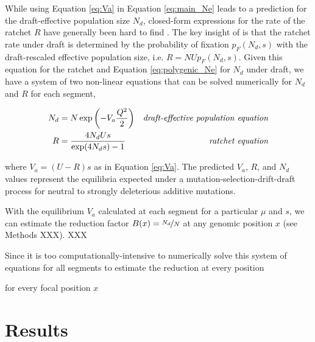 \documentclass[11pt]{article}
\begin{document}
While using Equation \eqref{eq:Va} in Equation \eqref{eq:main_Ne} leads to a
prediction for the draft-effective population size $N_d$, closed-form
expressions for the rate of the ratchet $R$ have generally been hard to find
\parencite{Haigh1978-gt,Higgs1995-xc,Gessler1995-hz}. The key insight of
\textcite{Santiago2016-mu} is that the ratchet rate under draft is determined
by the probability of fixation $p_F(N_d, s)$
\parencite{Kimura1962-su,Malecot1948-zv} with the draft-rescaled effective
population size, i.e. $R = N U p_F(N_d, s)$. Given this equation for the
ratchet and Equation \eqref{eq:polygenic_Ne} for $N_d$ under draft, we have a
system of two non-linear equations that can be solved numerically for $N_d$ and
$R$ for each segment,

\begin{align}
  \label{eq:main_eqns}
  N_d &= N \exp \left( -V_a \frac{Q^2}{2} \right) & \text{\emph{draft-effective population equation}} \\
  R &= \frac{4N_d U s}{\exp(4 N_d s)-1}  & \text{\emph{ratchet equation}}
\end{align}

where $V_a = (U-R)s$ as in Equation \eqref{eq:Va}. The predicted $V_a$, $R$,
and $N_d$ values represent the equilibria expected under a
mutation-selection-drift-draft process for neutral to strongly deleterious
additive mutations.

With the equilibrium $V_a$ calculated at each segment for a particular $\mu$
and $s$, we can estimate the reduction factor $B(x) = \nicefrac{N_d}{N}$ at any
genomic position $x$ (see Methods XXX). XXX

Since it is too computationally-intensive to numerically solve this system of
equations for all segments to estimate the reduction at every position 

for every focal position $x$




\section*{Results}
\end{document}
